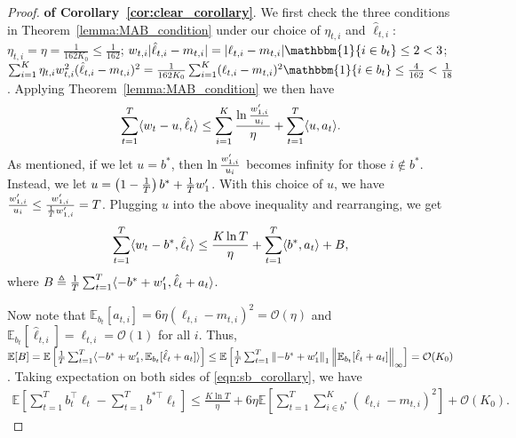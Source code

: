 \begin{proof}{\textbf{of Corollary~\ref{cor:clear_corollary}}.}
We first check the three conditions in Theorem~\ref{lemma:MAB_condition} under our choice of $\eta_{t,i}$ and $\hat{\ell}_{t,i}$: $\eta_{t,i}=\eta=\frac{1}{162K_0}\leq \frac{1}{162}$; $w_{t,i}\abs{\hat{\ell}_{t,i}-m_{t,i}}=\abs{\ell_{t,i}-m_{t,i}}\mathbbm{1}\{i\in b_t\} \leq 2<3$; 
$\sum_{i=1}^K \eta_{t,i}w_{t,i}^2(\hat{\ell}_{t,i}-m_{t,i})^2=\frac{1}{162K_0}\sum_{i=1}^K (\ell_{t,i}-m_{t,i})^2\mathbbm{1}\{i\in b_t\} \leq \frac{4}{162} < \frac{1}{18}$. 
Applying Theorem~\ref{lemma:MAB_condition} we then have 
\begin{align*}
\sum_{t=1}^T \langle {w_t-u, \hat{\ell}_t} \rangle\leq \sum_{i=1}^K  \frac{\ln\frac{w^\prime_{1,i}}{u_i}}{\eta}  +\sum_{t=1}^T \langle {u,a_t} \rangle.
\end{align*}
As mentioned, if we let $u=b^*$, then $\ln \frac{w_{1,i}^\prime}{u_i}$
becomes infinity for those $i\notin b^*$. Instead, we let $u=\left(1-\frac{1}{T}\right)b^* + \frac{1}{T}w_1^\prime$. With this choice of $u$, we have $\frac{w_{1,i}^\prime}{u_i}\leq \frac{w_{1,i}^\prime}{\frac{1}{T}w_{1,i}^\prime}=T$. Plugging $u$ into the above inequality and rearranging, we get 
\begin{align}
\sum_{t=1}^T \langle {w_t-b^*, \hat{\ell}_t} \rangle\leq \frac{K\ln T}{\eta}+\sum_{t=1}^T \langle {b^*,a_t} \rangle+B,  \label{eqn:sb_corollary}
\end{align}
where $B\triangleq \frac{1}{T}\sum_{t=1}^T \langle {-b^*+w_1^\prime, \hat{\ell}_t+a_t} \rangle$. 

Now note that $\mathbb{E}_{b_t}[a_{t,i}]=6\eta (\ell_{t,i}-m_{t,i})^2=\mathcal{O}(\eta)$ and $\mathbb{E}_{b_t}[\hat{\ell}_{t,i}]=\ell_{t,i}=\mathcal{O}(1)$ for all $i$. Thus, $\mathbb{E}[B]=\mathbb{E}\left[\frac{1}{T}\sum_{t=1}^T \langle {-b^*+w_1^\prime, \mathbb{E}_{b_t}[\hat{\ell}_t+a_t]} \rangle\right] \leq \mathbb{E}\left[\frac{1}{T}\sum_{t=1}^T \left\lVert-b^*+w_1^\prime\right\rVert_1 \left\lVert\mathbb{E}_{b_t}[\hat{\ell}_t+a_t]\right\rVert_\infty\right] = \mathcal{O}(K_0)$. Taking expectation on both sides of \eqref{eqn:sb_corollary}, we have 
\begin{align*}
\mathbb{E}\left[\sum_{t=1}^T b_t^\top \ell_t  - \sum_{t=1}^T b^{*\top} \ell_t \right] \leq \frac{K\ln T}{\eta} + 6\eta\mathbb{E}\left[\sum_{t=1}^T \sum_{i\in b^*}^K (\ell_{t,i}-m_{t,i})^2\right] + \mathcal{O}(K_0). 
\end{align*}
\end{proof}

